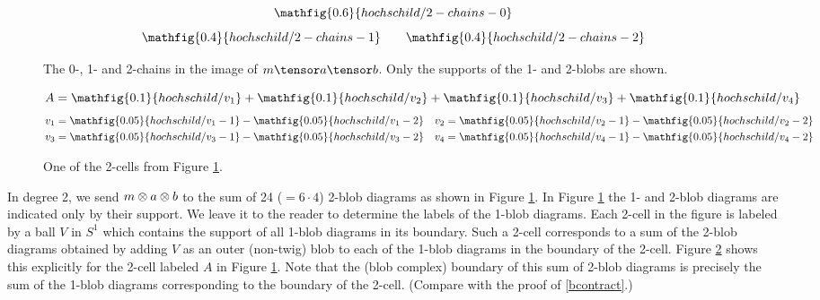 \begin{figure}[t]
\begin{equation*}
\mathfig{0.6}{hochschild/2-chains-0}
\end{equation*}
\begin{equation*}
\mathfig{0.4}{hochschild/2-chains-1} \qquad \mathfig{0.4}{hochschild/2-chains-2}
\end{equation*}
\caption{The 0-, 1- and 2-chains in the image of $m \tensor a \tensor b$. Only the supports of the 1- and 2-blobs are shown.}
\label{fig:hochschild-2-chains}
\end{figure}

\begin{figure}[t]
\begin{equation*}
A = \mathfig{0.1}{hochschild/v_1} + \mathfig{0.1}{hochschild/v_2} + \mathfig{0.1}{hochschild/v_3} + \mathfig{0.1}{hochschild/v_4}
\end{equation*}
\begin{align*}
v_1 & = \mathfig{0.05}{hochschild/v_1-1} -  \mathfig{0.05}{hochschild/v_1-2} &  v_2 & = \mathfig{0.05}{hochschild/v_2-1} -  \mathfig{0.05}{hochschild/v_2-2} \\ 
v_3 & = \mathfig{0.05}{hochschild/v_3-1} -  \mathfig{0.05}{hochschild/v_3-2} &  v_4 & = \mathfig{0.05}{hochschild/v_4-1} -  \mathfig{0.05}{hochschild/v_4-2}
\end{align*}
\caption{One of the 2-cells from Figure \ref{fig:hochschild-2-chains}.}
\label{fig:hochschild-example-2-cell}
\end{figure}

In degree 2, we send $m\otimes a \otimes b$ to the sum of 24 ($=6\cdot4$) 2-blob diagrams as shown in
Figure \ref{fig:hochschild-2-chains}. In Figure \ref{fig:hochschild-2-chains} the 1- and 2-blob diagrams are indicated only by their support.
We leave it to the reader to determine the labels of the 1-blob diagrams.
Each 2-cell in the figure is labeled by a ball $V$ in $S^1$ which contains the support of all
1-blob diagrams in its boundary.
Such a 2-cell corresponds to a sum of the 2-blob diagrams obtained by adding $V$
as an outer (non-twig) blob to each of the 1-blob diagrams in the boundary of the 2-cell.
Figure \ref{fig:hochschild-example-2-cell} shows this explicitly for the 2-cell
labeled $A$ in Figure \ref{fig:hochschild-2-chains}.
Note that the (blob complex) boundary of this sum of 2-blob diagrams is
precisely the sum of the 1-blob diagrams corresponding to the boundary of the 2-cell.
(Compare with the proof of \ref{bcontract}.)
